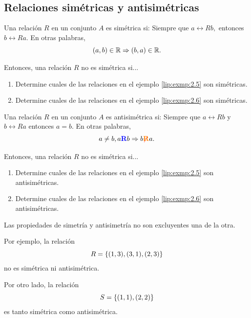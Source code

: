\subsection{Relaciones sim\'etricas y antisim\'etricas}


	Una relaci\'on $R$ en un conjunto $A$ es sim\'etrica si: Siempre que $a\rel{R}b,$ entonces $b\rel{R}a.$  En otras palabras, 
	$$
	(a,b)\in \mathbb{R} \Rightarrow (b,a)\in \mathbb{R}.
	$$
	
	Entonces, una relaci\'on $R$ no es sim\'etrica si...
 


	\begin{exmp}
		\label{lip:exmp:2.7}
		\begin{enumerate}
			\item   Determine cuales de las relaciones en el ejemplo \ref{lip:exmp:2.5} son sim\'etricas.
			\item Determine cuales de las relaciones en el ejemplo \ref{lip:exmp:2.6} son sim\'etricas.
		\end{enumerate}
		
	\end{exmp}




	Una relaci\'on $R$ en un conjunto $A$ es antisim\'etrica si: Siempre que $a\rel{R}b$ y $b\rel{R}a$ entonces $a=b.$  En otras palabras, 
	$$
	a\neq b, a{ {\color{blue}\textbf{R}} }b \Rightarrow b{ {\color{red}\not}{\color{orange}\textbf{R}} }a.
	$$
	
	Entonces, una relaci\'on $R$ no es sim\'etrica si...
 


	\begin{exmp}
		\label{lip:exmp:2.8}
		\begin{enumerate}
			\item   Determine cuales de las relaciones en el ejemplo \ref{lip:exmp:2.5} son antisim\'etricas.
			\item Determine cuales de las relaciones en el ejemplo \ref{lip:exmp:2.6} son antisim\'etricas.
		\end{enumerate}
		
	\end{exmp}



	\begin{rem}
		Las propiedades de simetr\'ia y antisimetr\'ia no son excluyentes una de la otra. 
		
		Por ejemplo, la relaci\'on $$R=\left\{ (1,3),(3,1),(2,3) \right\}$$ no es sim\'etrica ni antisim\'etrica. 
		
		Por otro lado, la relaci\'on $$S=\left\{ (1,1),(2,2) \right\}$$ es tanto sim\'etrica como antisim\'etrica.
	\end{rem}
	


